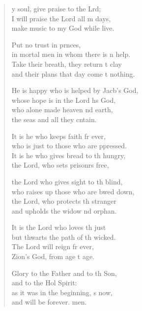 \settowidth{\versewidth}{He is happy who is helped by Jacob’s God, *}
\begin{verse}%
  \begin{patverse}
y soul, give praise to the Lrd;\Flex\\
I will praise the Lord all m days,\Med\\
make music to my God while  live.

Put no trust in pr\pointup{\i}nces,\Med\\
in mortal men in whom there is n help.\\
Take their breath, they return t clay\Med\\
and their plans that day come t nothing.

He is happy who is helped by Jacb’s God,\Med\\
whose hope is in the Lord h\pointup{\i}s God,\\
who alone made heaven nd earth,\Med\\
the seas and all they cntain.

It is he who keeps faith fr ever,\Med\\
who is just to those who are ppressed.\\
It is he who gives bread to th hungry,\Med\\
the Lord, who sets prisonrs free,

the Lord who gives sight to th blind,\Med\\
who raises up those who are bwed down,\\
the Lord, who protects th stranger\Med\\
and upholds the widow nd orphan.

It is the Lord who loves th just\Med\\
but thwarts the path of th wicked.\\
The Lord will reign fr ever,\Med\\
Zion’s God, from age t age.

Glory to the Father and to th Son,\Med\\
and to the Hol Spirit:\\
as it was in the beginning, \pointup{\i}s now,\Med\\
and will be forever. men. 
  \end{patverse}
\end{verse}
